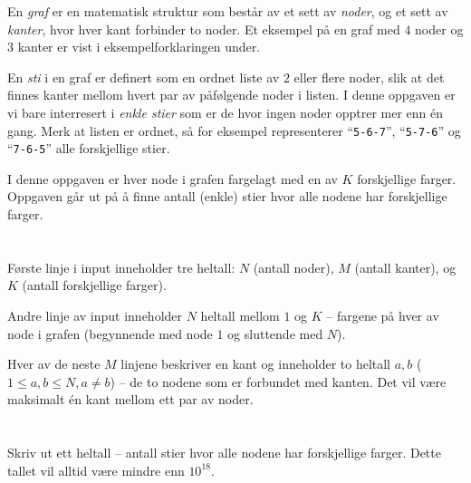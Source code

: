 \ifx\boi\undefined\fi
\def\version{jury-1}
En {\em graf} er en matematisk struktur som består av et sett av {\em noder}, og et sett av {\em kanter}, hvor hver kant forbinder to noder. Et eksempel på en graf med $4$ noder og $3$ kanter er vist i eksempelforklaringen under.

En {\em sti} i en graf er definert som en ordnet liste av $2$ eller flere noder, slik at det finnes kanter mellom
hvert par av påfølgende noder i listen. I denne oppgaven er vi bare interresert i {\em enkle stier}
som er de hvor ingen noder opptrer mer enn én gang. Merk at listen er ordnet, så for eksempel representerer
``\texttt{5-6-7}'', ``\texttt{5-7-6}'' og ``\texttt{7-6-5}'' alle forskjellige stier.


I denne oppgaven er hver node i grafen fargelagt med en av $K$ forskjellige farger. Oppgaven går ut på å finne antall
(enkle) stier hvor alle nodene har forskjellige farger.

\section*{}
Første linje i input inneholder tre heltall: $N$ (antall noder), $M$ (antall kanter), og $K$ (antall forskjellige farger).


Andre linje av input inneholder $N$ heltall mellom $1$ og $K$ -- fargene på hver av node i grafen (begynnende med node $1$ og sluttende med $N$).

Hver av de neste $M$ linjene beskriver en kant og inneholder to heltall $a, b$ ($1 \le a, b \le N, a \neq b$)
-- de to nodene som er forbundet med kanten. Det vil være maksimalt én kant mellom ett par av noder.

\section*{\outputsection}
Skriv ut ett heltall -- antall stier hvor alle nodene har forskjellige farger. Dette tallet vil alltid være mindre enn $10^{18}$.

\section*{\constraints}
\testgroups

